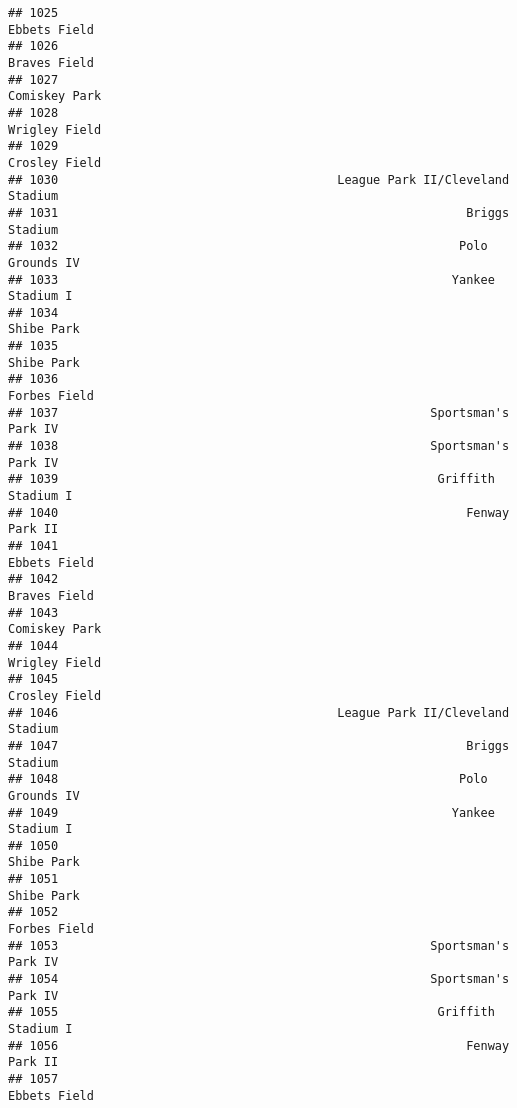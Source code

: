 \documentclass[]{article}
\begin{document}
\begin{verbatim}
## 1025                                                           Ebbets Field
## 1026                                                           Braves Field
## 1027                                                          Comiskey Park
## 1028                                                          Wrigley Field
## 1029                                                          Crosley Field
## 1030                                       League Park II/Cleveland Stadium
## 1031                                                         Briggs Stadium
## 1032                                                        Polo Grounds IV
## 1033                                                       Yankee Stadium I
## 1034                                                             Shibe Park
## 1035                                                             Shibe Park
## 1036                                                           Forbes Field
## 1037                                                    Sportsman's Park IV
## 1038                                                    Sportsman's Park IV
## 1039                                                     Griffith Stadium I
## 1040                                                         Fenway Park II
## 1041                                                           Ebbets Field
## 1042                                                           Braves Field
## 1043                                                          Comiskey Park
## 1044                                                          Wrigley Field
## 1045                                                          Crosley Field
## 1046                                       League Park II/Cleveland Stadium
## 1047                                                         Briggs Stadium
## 1048                                                        Polo Grounds IV
## 1049                                                       Yankee Stadium I
## 1050                                                             Shibe Park
## 1051                                                             Shibe Park
## 1052                                                           Forbes Field
## 1053                                                    Sportsman's Park IV
## 1054                                                    Sportsman's Park IV
## 1055                                                     Griffith Stadium I
## 1056                                                         Fenway Park II
## 1057                                                           Ebbets Field

\end{verbatim}
\end{document}
